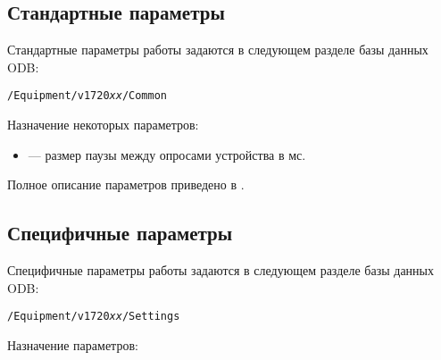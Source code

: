 \subsection{Стандартные параметры}
\label{fe-v1720-common-params}

Стандартные параметры работы \DEVICE{} задаются в следующем разделе базы данных ODB:

\medskip

{\tt /Equipment/v1720{\it xx}/Common}

\medskip

Назначение некоторых параметров:

\begin{itemize}

\item 

 --- размер паузы между опросами устройства в мс.

\end{itemize}

Полное описание параметров приведено в \cite{MidasWikiEquipment}.

\subsection{Специфичные параметры}
\label{sec-v1720-specific-params}

Специфичные параметры работы \DEVICE{} задаются в следующем разделе базы данных ODB:

\medskip

{\tt /Equipment/v1720{\it xx}/Settings}

\medskip

Назначение параметров:


